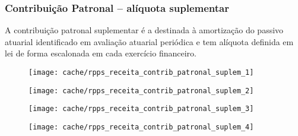 
\subsubsection[Contribuição Patronal Suplementar]{Contribuição Patronal – alíquota suplementar}

A contribuição patronal suplementar é a destinada à amortização do passivo atuarial identificado em avaliação atuarial periódica e tem alíquota definida em lei de forma escalonada em cada exercício financeiro.





\begin{figure}[H]
\center
\texttt{[image: cache/rpps\_receita\_contrib\_patronal\_suplem\_1]}
\end{figure}

\begin{figure}[H]
\center
\texttt{[image: cache/rpps\_receita\_contrib\_patronal\_suplem\_2]}
\end{figure}

\begin{figure}[H]
\center
\texttt{[image: cache/rpps\_receita\_contrib\_patronal\_suplem\_3]}
\end{figure}

\begin{figure}[H]
\center
\texttt{[image: cache/rpps\_receita\_contrib\_patronal\_suplem\_4]}
\end{figure}